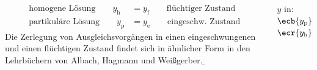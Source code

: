 \begin{frame}
\begin{columns}
{\begin{align}
        \text{homogene Lösung}\qquad y_{\mathrm{h}} &= y_{\mathrm{f}} \qquad \text{flüchtiger Zustand}\\
        \text{partikuläre Lösung}\qquad y_{\mathrm{p}} &= y_{\mathrm{e}} \qquad \text{eingeschw. Zustand}
    \end{align}
    Die Zerlegung von Ausgleichsvorgängen in einen eingeschwungenen und einen flüchtigen Zustand 
    findet sich in ähnlicher Form in den Lehrbüchern von Albach\cite{albach}, Hagmann\cite{hagmann} und Weißgerber\cite{weissgerber3}.  
}%
\b{%
     $y$ in:\\
     $\ecb{y_{\mathrm{p}}}$\\
     $\ecr{y_{\mathrm{h}}}$

}
\end{columns}
\end{frame}
